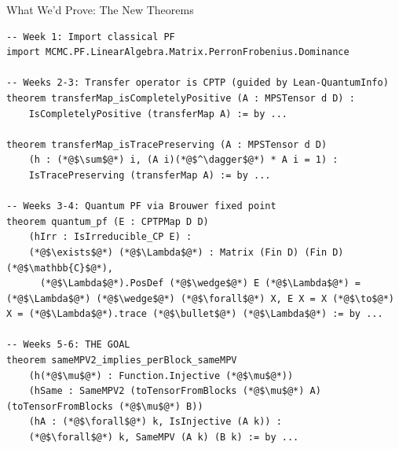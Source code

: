 \documentclass[aspectratio=169,10pt]{beamer}
\begin{document}
\begin{frame}[fragile]{What We'd Prove: The New Theorems}
\vspace{-0.3em}
\begin{lstlisting}[basicstyle=\ttfamily\fontsize{6.5}{8}\selectfont\color{white}]
-- Week 1: Import classical PF
import MCMC.PF.LinearAlgebra.Matrix.PerronFrobenius.Dominance

-- Weeks 2-3: Transfer operator is CPTP (guided by Lean-QuantumInfo)
theorem transferMap_isCompletelyPositive (A : MPSTensor d D) :
    IsCompletelyPositive (transferMap A) := by ...

theorem transferMap_isTracePreserving (A : MPSTensor d D)
    (h : (*@$\sum$@*) i, (A i)(*@$^\dagger$@*) * A i = 1) :
    IsTracePreserving (transferMap A) := by ...

-- Weeks 3-4: Quantum PF via Brouwer fixed point
theorem quantum_pf (E : CPTPMap D D)
    (hIrr : IsIrreducible_CP E) :
    (*@$\exists$@*) (*@$\Lambda$@*) : Matrix (Fin D) (Fin D) (*@$\mathbb{C}$@*),
      (*@$\Lambda$@*).PosDef (*@$\wedge$@*) E (*@$\Lambda$@*) = (*@$\Lambda$@*) (*@$\wedge$@*) (*@$\forall$@*) X, E X = X (*@$\to$@*) X = (*@$\Lambda$@*).trace (*@$\bullet$@*) (*@$\Lambda$@*) := by ...

-- Weeks 5-6: THE GOAL
theorem sameMPV2_implies_perBlock_sameMPV
    (h(*@$\mu$@*) : Function.Injective (*@$\mu$@*))
    (hSame : SameMPV2 (toTensorFromBlocks (*@$\mu$@*) A) (toTensorFromBlocks (*@$\mu$@*) B))
    (hA : (*@$\forall$@*) k, IsInjective (A k)) :
    (*@$\forall$@*) k, SameMPV (A k) (B k) := by ...
\end{lstlisting}
\end{frame}
\end{document}
